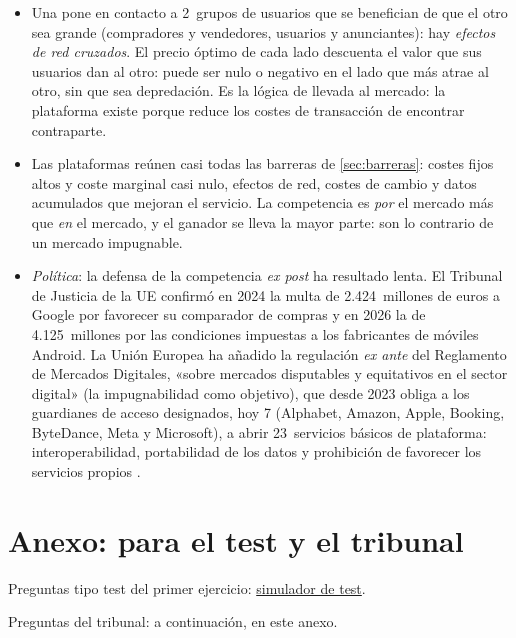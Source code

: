 \documentclass[11pt]{article}
\begin{document}
\begin{itemize}
\item Una  pone en contacto a 2~grupos de usuarios que se benefician de que el otro sea grande (compradores y vendedores, usuarios y anunciantes): hay \emph{efectos de red cruzados}\nocite{RochetTirole2003Platform}. El precio óptimo de cada lado descuenta el valor que sus usuarios dan al otro: puede ser nulo o negativo en el lado que más atrae al otro, sin que sea depredación\nocite{Armstrong2006Competition}. Es la lógica de  llevada al mercado: la plataforma existe porque reduce los costes de transacción de encontrar contraparte.
\item Las plataformas reúnen casi todas las barreras de \ref{sec:barreras}: costes fijos altos y coste marginal casi nulo, efectos de red, costes de cambio y datos acumulados que mejoran el servicio. La competencia es \emph{por} el mercado más que \emph{en} el mercado, y el ganador se lleva la mayor parte: son lo contrario de un mercado impugnable.
\item \emph{Política}: la defensa de la competencia \emph{ex post} ha resultado lenta. El Tribunal de Justicia de la UE confirmó en 2024 la multa de 2.424~millones de euros a Google por favorecer su comparador de compras\nocite{TJUE2024GoogleShopping} y en 2026 la de 4.125~millones por las condiciones impuestas a los fabricantes de móviles Android\nocite{TJUE2026GoogleAndroid}. La Unión Europea ha añadido la regulación \emph{ex ante} del Reglamento de Mercados Digitales, «sobre mercados disputables y equitativos en el sector digital» (la impugnabilidad como objetivo), que desde 2023 obliga a los guardianes de acceso designados, hoy 7 (Alphabet, Amazon, Apple, Booking, ByteDance, Meta y Microsoft), a abrir 23~servicios básicos de plataforma: interoperabilidad, portabilidad de los datos y prohibición de favorecer los servicios propios\nocite{UE2022DMA,CE2026GuardianesDMA} .
\end{itemize}

\section{Anexo: para el test y el tribunal}\label{anexo:test}

\begin{anotaciones}
Preguntas tipo test del primer ejercicio: \href{https://www.victorgutierrezmarcos.es/oposicion/temario/primer-ejercicio/test/simulador.html?tema=3.A.15}{simulador de test}.

Preguntas del tribunal: a continuación, en este anexo.
\end{anotaciones}
\end{document}
